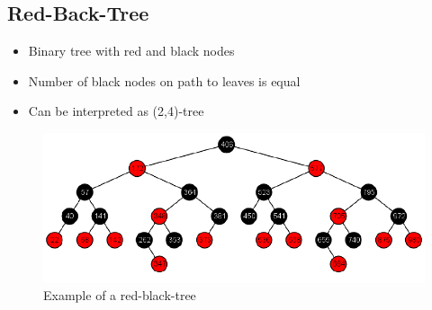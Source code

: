\documentclass[12pt, a4paper]{scrartcl}
\newcommand{\imgwidth}{.7\textwidth}
\begin{document}
\subsection{Red-Back-Tree}
\begin{itemize}
\item Binary tree with \textrm{red} and \textrm{black} nodes
\item Number of black nodes on path to leaves is equal
\item Can be interpreted as (2,4)-tree
\end{itemize}
\begin{figure}[htbp]
  \centering
  \includegraphics[width=\imgwidth]{red-black_tree}
  \caption{Example of a red-black-tree}
  \label{fig:red-black_tree}
\end{figure}
\end{document}
